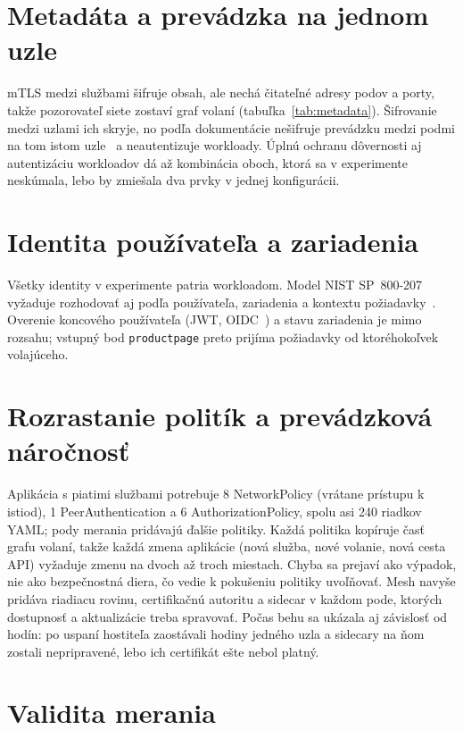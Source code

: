\section{Metadáta a prevádzka na jednom uzle}

mTLS medzi službami šifruje obsah, ale nechá čitateľné adresy podov a porty, takže pozorovateľ siete zostaví graf volaní (tabuľka~\ref{tab:metadata}). Šifrovanie medzi uzlami ich skryje, no podľa dokumentácie nešifruje prevádzku medzi podmi na tom istom uzle~\cite{cilium-wireguard} a neautentizuje workloady. Úplnú ochranu dôvernosti aj autentizáciu workloadov dá až kombinácia oboch, ktorá sa v experimente neskúmala, lebo by zmiešala dva prvky v jednej konfigurácii.

\section{Identita používateľa a zariadenia}

Všetky identity v experimente patria workloadom. Model NIST SP~800-207 vyžaduje rozhodovať aj podľa používateľa, zariadenia a kontextu požiadavky~\cite{nist-sp800-207}. Overenie koncového používateľa (JWT, OIDC~\cite{rfc7519,oidc-core}) a stavu zariadenia je mimo rozsahu; vstupný bod \texttt{productpage} preto prijíma požiadavky od ktoréhokoľvek volajúceho.

\section{Rozrastanie politík a prevádzková náročnosť}

Aplikácia s piatimi službami potrebuje 8 NetworkPolicy (vrátane prístupu k istiod), 1 PeerAuthentication a 6 AuthorizationPolicy, spolu asi 240 riadkov YAML; pody merania pridávajú ďalšie politiky. Každá politika kopíruje časť grafu volaní, takže každá zmena aplikácie (nová služba, nové volanie, nová cesta API) vyžaduje zmenu na dvoch až troch miestach. Chyba sa prejaví ako výpadok, nie ako bezpečnostná diera, čo vedie k pokušeniu politiky uvoľňovať. Mesh navyše pridáva riadiacu rovinu, certifikačnú autoritu a sidecar v každom pode, ktorých dostupnosť a aktualizácie treba spravovať. Počas behu sa ukázala aj závislosť od hodín: po uspaní hostiteľa zaostávali hodiny jedného uzla a sidecary na ňom zostali nepripravené, lebo ich certifikát ešte nebol platný.

\section{Validita merania}
\label{sec:limits-validity}

